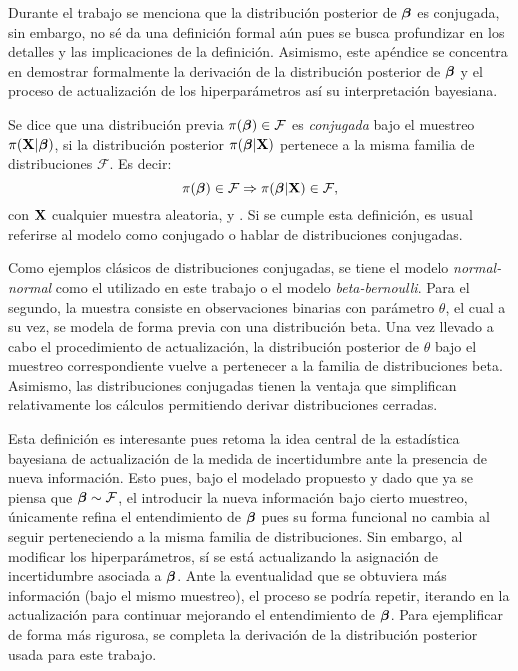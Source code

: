 \documentclass[../../Main/Main.tex]{subfiles}
\begin{document}
Durante el trabajo se menciona que la distribución posterior de $\bm{\beta}$ es conjugada, sin embargo, no sé da una definición formal aún pues se busca profundizar en los detalles y las implicaciones de la definición. Asimismo, este apéndice se concentra en demostrar formalmente la derivación de la distribución posterior de $\bm{\beta}$ y el proceso de actualización de los hiperparámetros así su interpretación bayesiana. \\

\begin{definition}
Se dice que una distribución previa $\pi(\bm{\beta})\in\mathcal{F}$  es \emph{conjugada} bajo el muestreo $\pi(\mathbf{X}|\bm{\beta})$, si la distribución posterior $\pi(\bm{\beta}|\mathbf{X})$ pertenece a la misma familia de distribuciones $\mathcal{F}$. Es decir: $$\pi(\bm{\beta}) \in \mathcal{F} \Rightarrow \pi(\bm{\beta}|\mathbf{X}) \in \mathcal{F}, $$ con $\mathbf{X}$ cualquier muestra aleatoria, \citet{mendoza2011estadistica} y \citet{barber2010bayesian}. Si se cumple esta definición, es usual referirse al modelo como conjugado o hablar  de distribuciones conjugadas.
\end{definition}
Como ejemplos clásicos de distribuciones conjugadas, se tiene el modelo \textit{normal-normal} como el utilizado en este trabajo o el modelo \textit{beta-bernoulli}. Para el segundo, la muestra consiste en observaciones binarias con parámetro $\theta$, el cual a su vez, se modela de forma previa con una distribución beta. Una vez llevado a cabo el procedimiento de actualización, la distribución posterior de $\theta$ bajo el muestreo correspondiente vuelve a pertenecer a la familia de distribuciones beta. Asimismo, las distribuciones conjugadas tienen la ventaja que simplifican relativamente los cálculos permitiendo derivar distribuciones cerradas.

Esta definición es interesante pues retoma la idea central de la estadística bayesiana de actualización de la medida de incertidumbre ante la presencia de nueva información. Esto pues, bajo el modelado propuesto y dado que ya se piensa que $\bm{\beta}\sim\mathcal{F}$, el introducir la nueva información bajo cierto muestreo, únicamente refina el entendimiento de $\bm{\beta}$ pues su forma funcional no cambia al seguir perteneciendo a la misma familia de distribuciones. Sin embargo, al modificar los hiperparámetros, sí se está actualizando la asignación de incertidumbre asociada a $\bm{\beta}$.  Ante la eventualidad que se obtuviera más información (bajo el mismo muestreo), el proceso se podría repetir, iterando en la actualización para continuar mejorando el entendimiento de $\bm{\beta}$. Para ejemplificar de forma más rigurosa, se completa la derivación de la distribución posterior usada para este trabajo.\\
\end{document}
